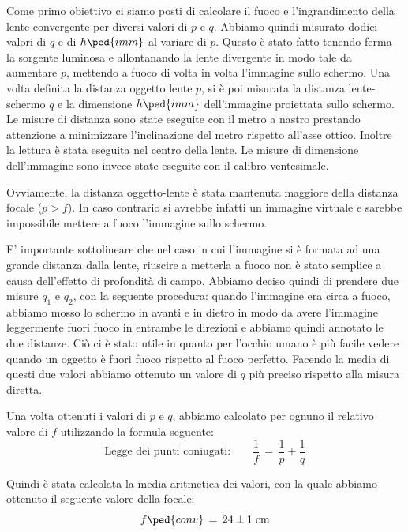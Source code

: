 Come primo obiettivo ci siamo posti di calcolare il fuoco e l'ingrandimento della lente convergente per diversi valori di $p$ e $q$. Abbiamo quindi misurato dodici valori di $q$ e di $h\ped{imm}$ al variare di $p$.
Questo è stato fatto tenendo ferma la sorgente luminosa e allontanando la lente divergente in modo tale da aumentare $p$, mettendo a fuoco di volta in volta l'immagine sullo schermo. %
Una volta definita la distanza oggetto lente $p$, si è poi misurata la distanza lente-schermo $q$ e la dimensione $h\ped{imm}$ dell'immagine proiettata sullo schermo. Le misure di distanza sono state eseguite con il metro a nastro prestando attenzione a minimizzare l'inclinazione del metro rispetto all'asse ottico. Inoltre la lettura è stata eseguita nel centro della lente. Le misure di dimensione dell'immagine sono invece state eseguite con il calibro ventesimale.

Ovviamente, la distanza oggetto-lente è stata mantenuta maggiore della distanza focale ($p > f$). In caso contrario si avrebbe infatti un immagine virtuale e sarebbe impossibile mettere a fuoco l'immagine sullo schermo.

E' importante sottolineare che nel caso in cui l'immagine si è formata ad una grande distanza dalla lente, riuscire a metterla a fuoco non è stato semplice a causa dell'effetto di profondità di campo. Abbiamo deciso quindi di prendere due misure $q_1$ e $q_2$, con la seguente procedura: quando l'immagine era circa a fuoco, abbiamo mosso lo schermo in avanti e in dietro in modo da avere l'immagine leggermente fuori fuoco in entrambe le direzioni e abbiamo quindi annotato le due distanze. Ciò ci è stato utile in quanto per l'occhio umano è più facile vedere quando un oggetto è fuori fuoco rispetto al fuoco perfetto. Facendo la media di questi due valori abbiamo ottenuto un valore di $q$ %
più preciso rispetto alla misura diretta.

Una volta ottenuti i valori  di $p$ e $q$, abbiamo calcolato per ognuno il relativo valore di $f$ utilizzando la formula seguente:
\begin{equation}
	\text{Legge dei punti coniugati:} \qquad \frac{1}{f} \,=\, \frac{1}{p} + \frac{1}{q}
	\label{eq:coniugati}
\end{equation}

Quindi è stata calcolata la media aritmetica dei valori, con la quale abbiamo ottenuto il seguente valore della focale:
\begin{equation}
    f \ped{conv} \,=\, 24 \pm 1 \; \si{\centi\metre}
\end{equation}

